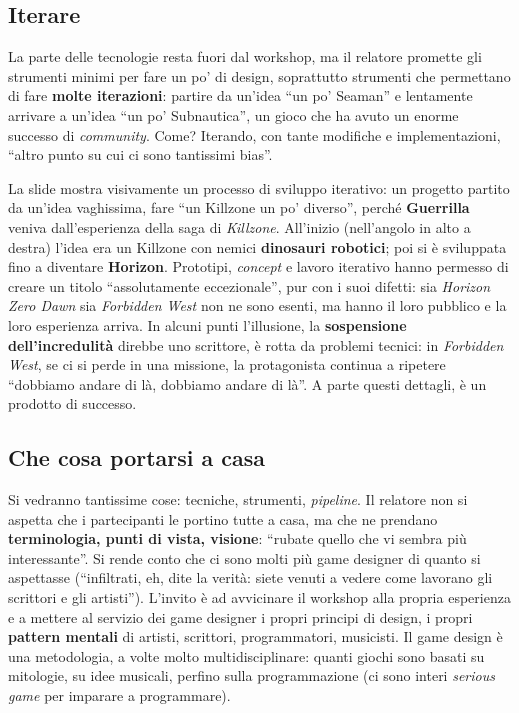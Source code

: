\subsection{Iterare}

La parte delle tecnologie resta fuori dal workshop, ma il relatore promette gli
strumenti minimi per fare un po' di design, soprattutto strumenti che permettano
di fare \textbf{molte iterazioni}: partire da un'idea ``un po' Seaman'' e
lentamente arrivare a un'idea ``un po' Subnautica'', un gioco che ha avuto un
enorme successo di \emph{community}. Come? Iterando, con tante modifiche e
implementazioni, ``altro punto su cui ci sono tantissimi bias''.

La slide mostra visivamente un processo di sviluppo iterativo: un progetto
partito da un'idea vaghissima, fare ``un Killzone un po' diverso'', perché
\textbf{Guerrilla} veniva dall'esperienza della saga di \emph{Killzone}.
All'inizio (nell'angolo in alto a destra) l'idea era un Killzone con nemici
\textbf{dinosauri robotici}; poi si è sviluppata fino a diventare
\textbf{Horizon}. Prototipi, \emph{concept} e lavoro iterativo hanno permesso di
creare un titolo ``assolutamente eccezionale'', pur con i suoi difetti: sia
\emph{Horizon Zero Dawn} sia \emph{Forbidden West} non ne sono esenti, ma hanno
il loro pubblico e la loro esperienza arriva. In alcuni punti l'illusione, la
\textbf{sospensione dell'incredulità} direbbe uno scrittore, è rotta da problemi
tecnici: in \emph{Forbidden West}, se ci si perde in una missione, la
protagonista continua a ripetere ``dobbiamo andare di là, dobbiamo andare di
là''. A parte questi dettagli, è un prodotto di successo.

\subsection{Che cosa portarsi a casa}

Si vedranno tantissime cose: tecniche, strumenti, \emph{pipeline}. Il relatore
non si aspetta che i partecipanti le portino tutte a casa, ma che ne prendano
\textbf{terminologia, punti di vista, visione}: ``rubate quello che vi sembra più
interessante''. Si rende conto che ci sono molti più game designer di quanto si
aspettasse (``infiltrati, eh, dite la verità: siete venuti a vedere come
lavorano gli scrittori e gli artisti''). L'invito è ad avvicinare il workshop
alla propria esperienza e a mettere al servizio dei game designer i propri
principi di design, i propri \textbf{pattern mentali} di artisti, scrittori,
programmatori, musicisti. Il game design è una metodologia, a volte molto
multidisciplinare: quanti giochi sono basati su mitologie, su idee musicali,
perfino sulla programmazione (ci sono interi \emph{serious game} per imparare a
programmare).

